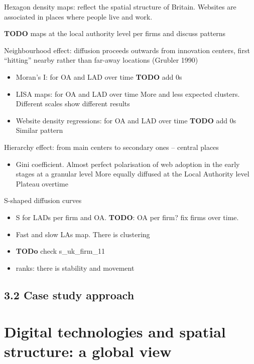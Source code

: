 \documentclass[10pt,letterpaper]{article}
\providecommand{\tightlist}{%
  \setlength{\itemsep}{0pt}\setlength{\parskip}{0pt}}
\begin{document}
Hexagon density maps: reflect the spatial structure of Britain. Websites
are associated in places where people live and work.

\textbf{TODO} maps at the local authority level per firms and discuss
patterns

Neighbourhood effect: diffusion proceeds outwards from innovation
centers, first ``hitting'' nearby rather than far-away locations
(Grubler 1990)

\begin{itemize}
\item
  Moran's I: for OA and LAD over time \textbf{TODO} add 0s
\item
  LISA maps: for OA and LAD over time More and less expected clusters.
  Different scales show different results
\item
  Website density regressions: for OA and LAD over time \textbf{TODO}
  add 0s Similar pattern
\end{itemize}

Hierarchy effect: from main centers to secondary ones -- central places

\begin{itemize}
\tightlist
\item
  Gini coefficient. Almost perfect polarisation of web adoption in the
  early stages at a granular level More equally diffused at the Local
  Authority level Plateau overtime
\end{itemize}

S-shaped diffusion curves

\begin{itemize}
\item
  S for LADs per firm and OA. \textbf{TODO}: OA per firm? fix firms over
  time.
\item
  Fast and slow LAs map. There is clustering
\item
  \textbf{TODo} check s\_uk\_firm\_11
\item
  ranks: there is stability and movement
\end{itemize}

\hypertarget{sec3.2}{%
\subsection{3.2 Case study approach}\label{sec3.2}}

\hypertarget{sec4}{%
\section{Digital technologies and spatial structure: a global
view}\label{sec4}}
\end{document}
